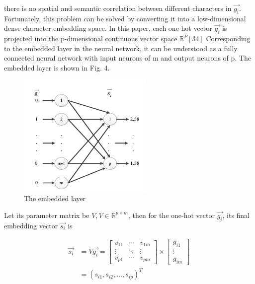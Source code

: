 \documentclass{ieeeaccess}
\begin{document}
there is no spatial and semantic correlation between different
characters in $\overrightarrow{g_{i}}$. Fortunately, this problem can be solved by
converting it into a low-dimensional dense character embedding
space. In this paper, each one-hot vector $\overrightarrow{g_{i}}$ is projected
into the p-dimensional continuous vector space $\mathbb{R}^{P}[34]$ 
Corresponding to the embedded layer in the neural network, it can
be understood as a fully connected neural network with input
neurons of m and output neurons of p. The embedded layer is
shown in Fig. 4.
\begin{figure}
    \centering
    \includegraphics[width=\linewidth]{figure4.png}
    \caption{The embedded layer}
    \label{fig:4}
\end{figure}
\par Let its parameter matrix be $V, V \in \mathbb{R}^{p \times m}$, then for the
one-hot vector $\overrightarrow{g_{i}}$, its final embedding vector $\overrightarrow{s_{i}}$ is \par
\begin{equation}
\begin{aligned} \overrightarrow{s_{i}} &=V \overrightarrow{g_{i}}=\left[\begin{array}{ccc}{v_{11}} & {\cdots} & {v_{1 m}} \\ {\vdots} & {\ddots} & {\vdots} \\ {v_{p 1}} & {\cdots} & {v_{p m}}\end{array}\right] \times\left[\begin{array}{c}{g_{i 1}} \\ {\vdots} \\ {g_{i m}}\end{array}\right] \\ &=\left(s_{i 1}, s_{i 2}, \ldots, s_{i p}\right)^{T} \end{aligned}
\end{equation}\par
\end{document}
